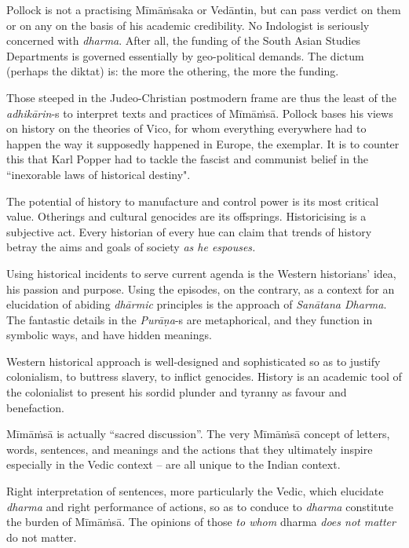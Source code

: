 Pollock is not a practising Mīmāṁsaka or Vedāntin, but can pass verdict on them or on any on the basis of his academic credibility. No Indologist is seriously concerned with \textit{dharma}. After all, the funding of the South Asian Studies Departments is governed essentially by geo-political demands. The dictum (perhaps the diktat) is: the more the othering, the more the funding.

 Those steeped in the Judeo-Christian postmodern frame are thus the least of the \textit{adhikārin}-s to interpret texts and practices of Mīmāṁsā. Pollock bases his views on history on the theories of Vico, for whom everything everywhere had to happen the way it supposedly happened in Europe, the exemplar. It is to counter this that Karl Popper had to tackle the fascist and communist belief in the ``inexorable laws of historical destiny".

 The potential of history to manufacture and control power is its most critical value. Otherings and cultural genocides are its offsprings. Historicising is a subjective act. Every historian of every hue can claim that trends of history betray the aims and goals of society \textit{as he espouses.}

Using historical incidents to serve current agenda is the Western historians’ idea, his passion and purpose. Using the episodes, on the contrary, as a context for an elucidation of abiding \textit{dhārmic} principles is the approach of \textit{Sanātana Dharma}. The fantastic details in the \hbox{\textit{Purāṇa}-s} are metaphorical, and they function in symbolic ways, and have hidden meanings.

Western historical approach is well-designed and sophisticated so as to justify colonialism, to buttress slavery, to inflict genocides. History is an academic tool of the colonialist to present his sordid plunder and tyranny as favour and benefaction.

Mīmāṁsā is actually “sacred discussion”. The very Mīmāṁsā concept of letters, words, sentences, and meanings and the actions that they ultimately inspire especially in the Vedic context – are all unique to the Indian context.

Right interpretation of sentences, more particularly the Vedic, which elucidate \textit{dharma} and right performance of actions, so as to conduce to \textit{dharma} constitute the burden of Mīmāṁsā. The opinions of those \textit{to whom} dharma \textit{does not matter} do not matter.

